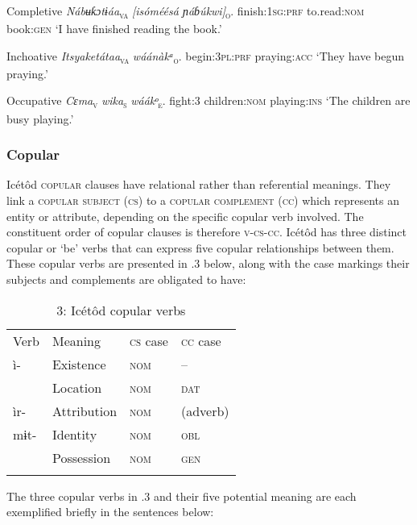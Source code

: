 Completive
\textit{Nábʉƙɔtɨáa}\textsc{\textsubscript{va}}\textit{    [isóméésá   ɲáɓúkwi]}\textsc{\textsubscript{o}}.
finish:\textsc{1sg:prf}   to.read:\textsc{nom}   book:\textsc{gen}
‘I have finished reading the book.’




Inchoative
\textit{Itsyaketátaa}\textsc{\textsubscript{va}}\textit{  wáánàkᵃ}\textsc{\textsubscript{o}}.
begin:\textsc{3pl:prf}   praying:\textsc{acc}
‘They have begun praying.’




Occupative
\textit{Cɛma}\textsc{\textsubscript{v}}  \textit{  wika}\textsc{\textsubscript{s}}\textit{       wáákᵒ}\textsc{\textsubscript{e}}.
fight:3   children:\textsc{nom}   playing:\textsc{ins}
‘The children are busy playing.’




\subsubsection{Copular}

Icétôd \textsc{copular} clauses have relational rather than referential meanings. They link a \textsc{copular subject} (\textsc{cs}) to a \textsc{copular} \textsc{complement} (\textsc{cc}) which represents an entity or attribute, depending on the specific copular verb involved. The constituent order of copular clauses is therefore \textsc{v-cs-cc}. Icétôd has three distinct copular or ‘be’ verbs that can express five copular relationships between them. These copular verbs are presented in .3 below, along with the case markings their subjects and complements are obligated to have:


\begin{table}
\caption{3: Icétôd copular verbs}
\label{tab:10}


\begin{tabularx}{\textwidth}{XXXX}
\lsptoprule

Verb & Meaning & \textsc{cs} case & \textsc{cc} case\\
ì- & Existence & \textsc{nom} & \textsc{–}\\
& Location & \textsc{nom} & \textsc{dat}\\
ìr- & Attribution & \textsc{nom} & (adverb)\\
mɨt- & Identity & \textsc{nom} & \textsc{obl}\\
& Possession & \textsc{nom} & \textsc{gen}\\
\lspbottomrule
\end{tabularx}
\end{table}
The three copular verbs in .3 and their five potential meaning are each exemplified briefly in the sentences below:




